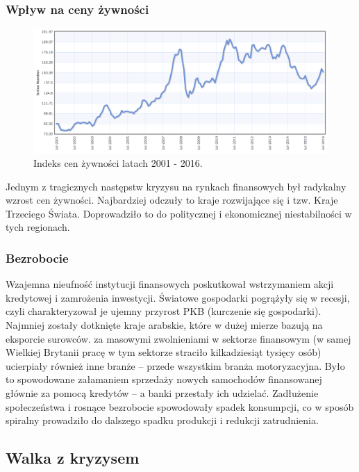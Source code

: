 \subsubsection{Wpływ na ceny żywności}

\begin{figure}[h] \centering %
	\includegraphics[scale=0.4]{img/food_index.png}
	\caption{Indeks cen żywności latach 2001 - 2016.\cite{indexmundi}} %
	\label{foodPriceIndex}
\end{figure}

Jednym z tragicznych następstw kryzysu na rynkach finansowych był radykalny wzrost cen żywności. Najbardziej odczuły to kraje rozwijające się i tzw. Kraje Trzeciego Świata. Doprowadziło to do politycznej i ekonomicznej niestabilności w tych regionach.

\subsubsection{Bezrobocie}

Wzajemna nieufność instytucji finansowych poskutkował wstrzymaniem akcji kredytowej i zamrożenia inwestycji. Światowe gospodarki pogrążyły się w recesji, czyli charakteryzował je ujemny przyrost PKB (kurczenie się gospodarki). Najmniej zostały dotknięte kraje arabskie, które w dużej mierze bazują na eksporcie surowców.
za masowymi zwolnieniami w sektorze finansowym (w samej Wielkiej Brytanii pracę w tym sektorze straciło kilkadziesiąt tysięcy osób) ucierpiały również inne branże – przede wszystkim branża motoryzacyjna. Było to spowodowane załamaniem sprzedaży nowych samochodów finansowanej głównie za pomocą kredytów – a banki przestały ich udzielać.
Zadłużenie społeczeństwa i rosnące bezrobocie spowodowały spadek konsumpcji, co w sposób spiralny prowadziło do dalszego spadku produkcji i redukcji zatrudnienia.

\subsection{Walka z kryzysem}

